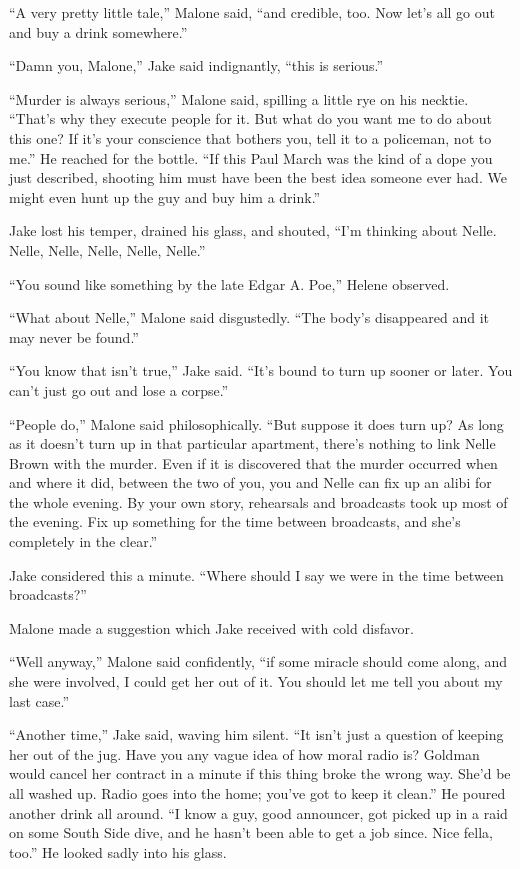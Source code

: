 \documentclass{novel}
\begin{document}
“A very pretty little tale,” Malone said, “and credible, too. Now let’s all go out and buy a drink somewhere.”

“Damn you, Malone,” Jake said indignantly, “this is serious.”

“Murder is always serious,” Malone said, spilling a little rye on his necktie. “That’s why they execute people for it. But what do you want me to do about this one? If it’s your conscience that bothers you, tell it to a policeman, not to me.” He reached for the bottle. “If this Paul March was the kind of a dope you just described, shooting him must have been the best idea someone ever had. We might even hunt up the guy and buy him a drink.”

Jake lost his temper, drained his glass, and shouted, “I’m thinking about Nelle. Nelle, Nelle, Nelle, Nelle, Nelle.”

“You sound like something by the late Edgar A. Poe,” Helene observed.

“What about Nelle,” Malone said disgustedly. “The body’s disappeared and it may never be found.”

“You know that isn’t true,” Jake said. “It’s bound to turn up sooner or later. You can’t just go out and lose a corpse.”

“People do,” Malone said philosophically. “But suppose it does turn up? As long as it doesn’t turn up in that particular apartment, there’s nothing to link Nelle Brown with the murder. Even if it is discovered that the murder occurred when and where it did, between the two of you, you and Nelle can fix up an alibi for the whole evening. By your own story, rehearsals and broadcasts took up most of the evening. Fix up something for the time between broadcasts, and she’s completely in the clear.”

Jake considered this a minute. “Where should I say we were in the time between broadcasts?”

Malone made a suggestion which Jake received with cold disfavor.

“Well anyway,” Malone said confidently, “if some miracle should come along, and she were involved, I could get her out of it. You should let me tell you about my last case.”

“Another time,” Jake said, waving him silent. “It isn’t just a question of keeping her out of the jug. Have you any vague idea of how moral radio is? Goldman would cancel her contract in a minute if this thing broke the wrong way. She’d be all washed up. Radio goes into the home; you’ve got to keep it clean.” He poured another drink all around. “I know a guy, good announcer, got picked up in a raid on some South Side dive, and he hasn’t been able to get a job since. Nice fella, too.” He looked sadly into his glass.
\end{document}
